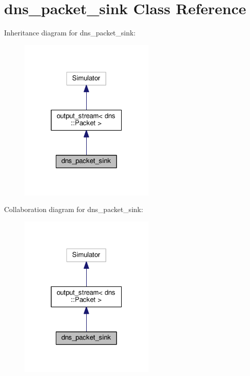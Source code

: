 \hypertarget{classdns__packet__sink}{}\section{dns\+\_\+packet\+\_\+sink Class Reference}
\label{classdns__packet__sink}


Inheritance diagram for dns\+\_\+packet\+\_\+sink\+:
\nopagebreak
\begin{figure}[H]
\begin{center}
\leavevmode
\includegraphics[width=184pt]{classdns__packet__sink__inherit__graph}
\end{center}
\end{figure}


Collaboration diagram for dns\+\_\+packet\+\_\+sink\+:
\nopagebreak
\begin{figure}[H]
\begin{center}
\leavevmode
\includegraphics[width=184pt]{classdns__packet__sink__coll__graph}
\end{center}
\end{figure}
